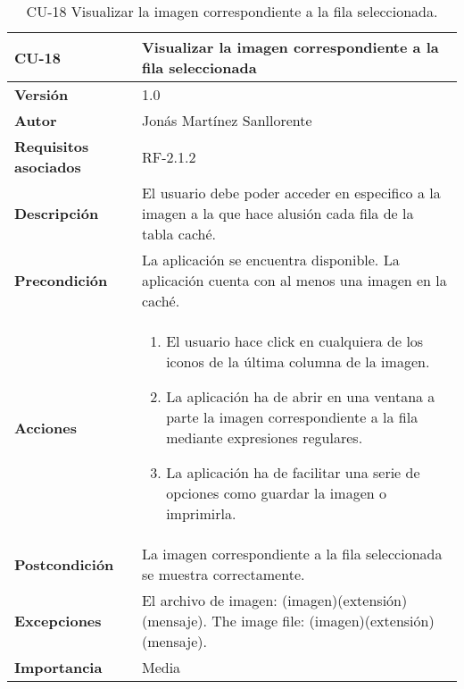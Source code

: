 \begin{table}[p]
	\centering
	\begin{tabularx}{\linewidth}{ p{} p{} }
		\toprule
		\textbf{CU-18}    & \textbf{Visualizar la imagen correspondiente a la fila seleccionada}\\
		\toprule
		\textbf{Versión}              & 1.0    \\
		\textbf{Autor}                & Jonás Martínez Sanllorente \\
		\textbf{Requisitos asociados} & RF-2.1.2 \\
		\textbf{Descripción}          & El usuario debe poder acceder en especifico a la imagen a la que hace alusión cada fila de la tabla caché. \\
		\textbf{Precondición}         & La aplicación se encuentra disponible.\newline
                                        La aplicación cuenta con al menos una imagen en la caché. \\
		\textbf{Acciones}             &
		\begin{enumerate}
			\def\labelenumi{\arabic{enumi}.}
			\tightlist
			\item El usuario hace click en cualquiera de los iconos de la última columna de la imagen.
			\item La aplicación ha de abrir en una ventana a parte la imagen correspondiente a la fila mediante expresiones regulares.
            \item La aplicación ha de facilitar una serie de opciones como guardar la imagen o imprimirla.
		\end{enumerate}\\
		\textbf{Postcondición}        & La imagen correspondiente a la fila seleccionada se muestra correctamente. \\
		\textbf{Excepciones}          & El archivo de imagen: (imagen)(extensión) (mensaje).\newline
                                        The image file: (imagen)(extensión) (mensaje). \\
		\textbf{Importancia}          & Media \\
		\bottomrule
	\end{tabularx}
	\caption{CU-18 Visualizar la imagen correspondiente a la fila seleccionada.}
\end{table}

